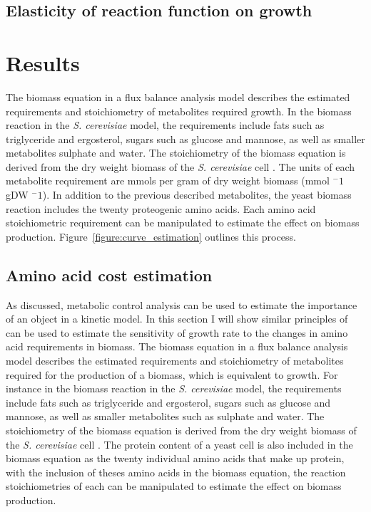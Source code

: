 \subsection{Elasticity of reaction function on growth}

\section{Results}

The biomass equation in a flux balance analysis model describes the estimated requirements and stoichiometry of metabolites required growth. In the biomass reaction in the \emph{S. cerevisiae} model, the requirements include fats such as triglyceride and ergosterol, sugars such as glucose and mannose, as well as smaller metabolites sulphate and water. The stoichiometry of the biomass equation is derived from the dry weight biomass of the \emph{S. cerevisiae} cell \cite{duarte2004}. The units of each metabolite requirement are mmols per gram of dry weight biomass (mmol $^-1$ gDW $^-1$). In addition to the previous described metabolites, the yeast biomass reaction includes the twenty proteogenic amino acids. Each amino acid stoichiometric requirement can be manipulated to estimate the effect on biomass production. Figure~\vref{figure:curve_estimation} outlines this process.

\subsection{Amino acid cost estimation}\label{section:amino_acid_cost_estimation}

As discussed, metabolic control analysis can be used to estimate the importance of an object in a kinetic model. In this section I will show similar principles of can be used to estimate the sensitivity of growth rate to the changes in amino acid requirements in biomass. The biomass equation in a flux balance analysis model describes the estimated requirements and stoichiometry of metabolites required for the production of a biomass, which is equivalent to growth. For instance in the biomass reaction in the \emph{S. cerevisiae} model, the requirements include fats such as triglyceride and ergosterol, sugars such as glucose and mannose, as well as smaller metabolites such as sulphate and water. The stoichiometry of the biomass equation is derived from the dry weight biomass of the \emph{S. cerevisiae} cell \cite{duarte2004a}. The protein content of a yeast cell is also included in the biomass equation as the twenty individual amino acids that make up protein, with the inclusion of theses amino acids in the biomass equation, the reaction stoichiometries of each can be manipulated to estimate the effect on biomass production.

